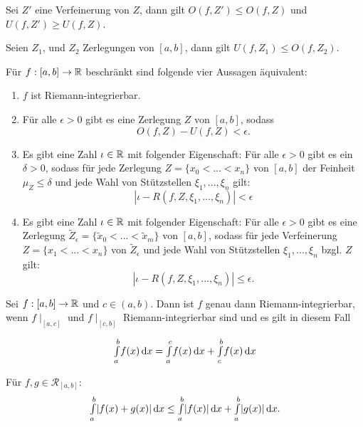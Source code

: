 \documentclass{cheat-sheet}
\begin{document}
\begin{bem}
Sei $Z'$ eine Verfeinerung von $Z$, dann gilt $O(f, Z') \le O(f, Z)$ und $U(f, Z') \ge U(f, Z)$.
\end{bem}

\begin{satz}
Seien $Z_1$, und $Z_2$ Zerlegungen von $[a, b]$, dann gilt $U(f, Z_1) \le O(f, Z_2)$.
\end{satz}

\begin{satz}
Für $f : [a, b] \to \mathbb{R}$ beschränkt sind folgende vier Aussagen äquivalent:

\begin{enumerate}
  \item $f$ ist Riemann-integrierbar.
  \item Für alle $\epsilon > 0$ gibt es eine Zerlegung $Z$ von $[a, b]$, sodass
    \[ O(f, Z) - U(f, Z) < \epsilon. \]
  \item Es gibt eine Zahl $\iota \in \mathbb{R}$ mit folgender Eigenschaft: Für alle $\epsilon > 0$ gibt es ein $\delta > 0$, sodass für jede Zerlegung $Z = \{ x_0 < ... < x_n \}$ von $[a, b]$ der Feinheit $\mu_Z \le \delta$ und jede Wahl von Stützstellen $\xi_1, ..., \xi_n$ gilt:
  \[ |\iota - R(f, Z, \xi_1, ..., \xi_n)| < \epsilon \]
  \item Es gibt eine Zahl $\iota \in \mathbb{R}$ mit folgender Eigenschaft: Für alle $\epsilon > 0$ gibt es eine Zerlegung $\widetilde{Z}_{\epsilon} = \{ \widetilde{x}_0 < ... < \widetilde{x}_m \}$ von $[a, b]$, sodass für jede Verfeinerung $Z = \{ x_1 < ... < x_n \}$ von $\widetilde{Z}_{\epsilon}$ und jede Wahl von Stützstellen $\xi_1, ..., \xi_n$ bzgl. $Z$ gilt:
  \[ | \iota - R(f, Z, \xi_1, ..., \xi_n) | \le \epsilon. \]
\end{enumerate}
\end{satz}


\begin{satz}
Sei $f : [a, b] \to \mathbb{R}$ und $c \in (a, b)$. Dann ist $f$ genau dann Riemann-integrierbar, wenn $f\mid_{[a, c]}$ und $f\mid_{[c, b]}$ Riemann-integrierbar sind und es gilt in diesem Fall

\[{\textstyle \int\limits_{a}^{b}} f(x) \,\mathrm{d} x = {\textstyle \int\limits_{a}^{c}} f(x) \,\mathrm{d} x + {\textstyle \int\limits_{c}^{b}} f(x) \,\mathrm{d} x \]
\end{satz}


\begin{satz}
  Für $f, g \in \mathcal{R}_{[a, b]}$:
  \[ {\textstyle \int\limits_{a}^{b}} |f(x) + g(x)| \,\mathrm{d} x \le {\textstyle \int\limits_{a}^{b}} |f(x)| \,\mathrm{d} x + {\textstyle \int\limits_{a}^{b}} |g(x)| \,\mathrm{d} x. \]
\end{satz}
\end{document}
